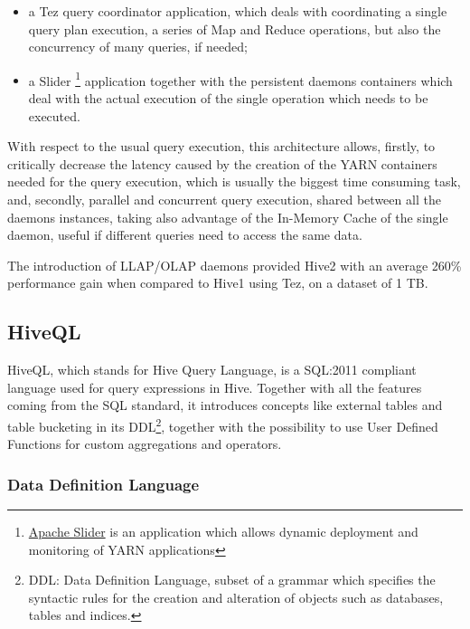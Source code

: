 \begin{itemize}
    \item a Tez query coordinator application, which deals with coordinating a single query plan execution, a series of Map and Reduce operations, but also the concurrency of many queries, if needed;
    \item a Slider \footnote{\href{https://slider.incubator.apache.org/}{Apache Slider} is an application which allows dynamic deployment and monitoring of YARN applications} application together with the persistent daemons containers which deal with the actual execution of the single operation which needs to be executed.
\end{itemize}

With respect to the usual query execution, this architecture allows, firstly, to critically decrease the latency caused by the creation of the YARN containers needed for the query execution, which is usually the biggest time consuming task, and, secondly, parallel and concurrent query execution, shared between all the daemons instances, taking also advantage of the In-Memory Cache of the single daemon, useful if different queries need to access the same data.

The introduction of LLAP/OLAP daemons provided Hive2 with an average 260\% performance gain when compared to Hive1 using Tez, on a dataset of 1 TB.

\subsection{HiveQL}

HiveQL, which stands for Hive Query Language, is a SQL:2011 compliant language used for query expressions in Hive. Together with all the features coming from the SQL standard, it introduces concepts like external tables and table bucketing in its DDL\footnote{DDL: Data Definition Language, subset of a grammar which specifies the syntactic rules for the creation and alteration of objects such as databases, tables and indices.}, together with the possibility to use User Defined Functions for custom aggregations and operators.

\subsubsection{Data Definition Language}

